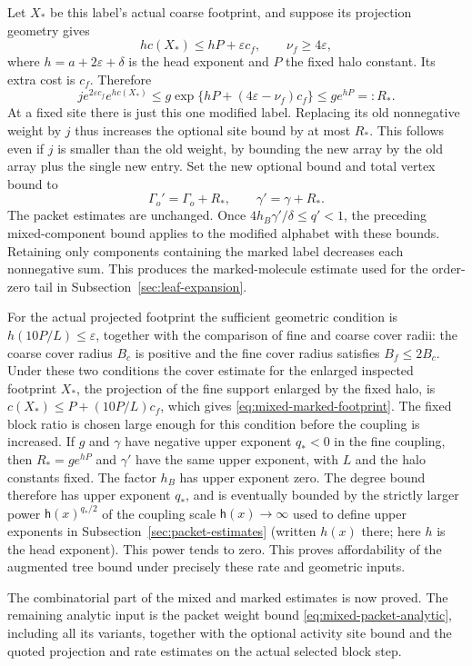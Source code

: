Let $X_*$ be this label's actual coarse footprint, and suppose its
projection geometry gives
\begin{equation}\label{eq:mixed-marked-footprint}
             h c(X_*)\le hP+\varepsilon c_f,
                       \qquad \nu_f\ge4\varepsilon,
\end{equation}
where $h=a+2\varepsilon+\delta$ is the head exponent and $P$ the
fixed halo constant. Its extra cost is $c_f$. Therefore
\[
 j e^{2\varepsilon c_f}e^{h c(X_*)}
    \le g\exp\{hP+(4\varepsilon-\nu_f)c_f\}
    \le g e^{hP}=:R_*.
\]
At a fixed site there is just this one modified label. Replacing its
old nonnegative weight by $j$ thus increases the optional site bound
by at most $R_*$. This follows even if $j$ is smaller than the old
weight, by bounding the new array by the old array plus the single
new entry. Set the new optional bound and total vertex bound to
\[
                   \Gamma_o'=\Gamma_o+R_*,\qquad
                                  \gamma'=\gamma+R_*.
\]
The packet estimates are unchanged. Once
$4h_B\gamma'/\delta\le q'<1$, the preceding mixed-component bound
applies to the modified alphabet with these bounds. Retaining only
components containing the marked label decreases each nonnegative
sum. This produces the marked-molecule estimate used for the
order-zero tail in Subsection~\ref{sec:leaf-expansion}.

For the actual projected footprint the sufficient geometric condition
is $h(10P/L)\le\varepsilon$, together with the comparison of fine
and coarse cover radii: the coarse cover radius $B_c$ is positive and
the fine cover radius satisfies $B_f\le2B_c$. Under these two
conditions the cover estimate for the enlarged inspected footprint
$X_*$, the projection of the fine support enlarged by the fixed halo,
is $c(X_*)\le P+(10P/L)c_f$, which gives
\eqref{eq:mixed-marked-footprint}. The fixed block ratio is chosen
large enough for this condition before the coupling is increased.
If $g$ and $\gamma$ have negative upper exponent $q_*<0$ in the
fine coupling, then $R_*=g e^{hP}$ and $\gamma'$ have the same upper
exponent, with $L$ and the halo constants fixed. The factor $h_B$
has upper exponent zero. The degree bound therefore has upper
exponent $q_*$, and is eventually bounded by the strictly larger
power $\mathsf h(x)^{q_*/2}$ of the coupling scale $\mathsf h(x)\to\infty$
used to define upper exponents in Subsection~\ref{sec:packet-estimates}
(written $h(x)$ there; here $h$ is the head exponent). This power tends
to zero. This proves affordability
of the augmented tree bound under precisely these rate and geometric
inputs.

The combinatorial part of the mixed and marked estimates is now
proved. The remaining analytic input is the packet weight bound
\eqref{eq:mixed-packet-analytic}, including all its variants, together
with the optional activity site bound and the quoted projection and
rate estimates on the actual selected block step.
